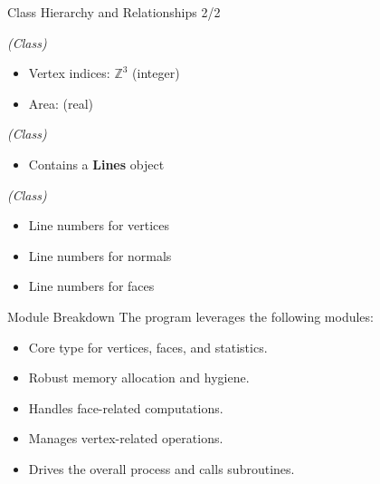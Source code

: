 \begin{frame}[fragile]{Class Hierarchy and Relationships 2/2}
\begin{description}[leftmargin=2cm]
    \item[\textbf{Face}] \textit{(Class)}  
        \begin{itemize}
            \item Vertex indices: $\mathbb{Z}^3$ (integer)
            \item Area: (real)
        \end{itemize}
        
    \item[\textbf{Census}] \textit{(Class)}  
        \begin{itemize}
            \item Contains a \textbf{Lines} object
        \end{itemize}
        
    \item[\textbf{Lines}] \textit{(Class)}  
        \begin{itemize}
            \item Line numbers for vertices
            \item Line numbers for normals
            \item Line numbers for faces
        \end{itemize}
\end{description}
\end{frame}

\begin{frame}{Module Breakdown}
    The program leverages the following modules:
    \begin{itemize}
        \item {} Core type for vertices, faces, and statistics.
        \item {} Robust memory allocation and hygiene.
        \item {} Handles face-related computations.
        \item {} Manages vertex-related operations.
        \item {} Drives the overall process and calls subroutines.
    \end{itemize}
\end{frame}

